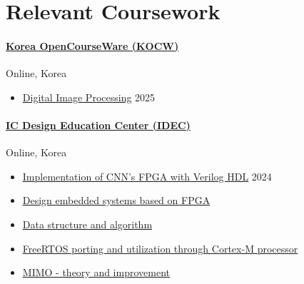\documentclass[a4paper,9pt]{extarticle}
\begin{document}
\section*{Relevant Coursework}
\paragraph{\large{\href{https://www.kocw.net/home/index.do}{Korea OpenCourseWare (KOCW)}}} \hfill Online, Korea
\begin{itemize}
    \item \href{https://github.com/user-attachments/assets/d8024d63-359a-493b-9cb2-774e36a03f62}{Digital Image Processing}                                              \hfill 2025
\end{itemize}

\paragraph{\large{\href{https://www.idec.or.kr/main/}{IC Design Education Center (IDEC)}}}  \hfill Online, Korea
\begin{itemize}
    \item \href{https://github.com/user-attachments/assets/234ad610-a051-4140-9f20-48ca4d8e4d42}{Implementation of CNN's FPGA with Verilog HDL}                         \hfill 2024
    \item \href{https://github.com/user-attachments/assets/68b0ae05-462b-4750-93ba-1bc4072dab66}{Design embedded systems based on FPGA}
    \item \href{https://github.com/user-attachments/assets/8fbda935-4b41-44f7-b83a-8d284f003168}{Data structure and algorithm}                                          
    \item \href{https://github.com/user-attachments/assets/805bbc13-3e6e-43d6-af75-df31f728d607}{FreeRTOS porting and utilization through Cortex-M processor}           
    \item \href{https://github.com/user-attachments/assets/707a4f8e-3b5a-4246-a763-81e2729f9cb2}{MIMO - theory and improvement}                                         
\end{itemize}
\end{document}
